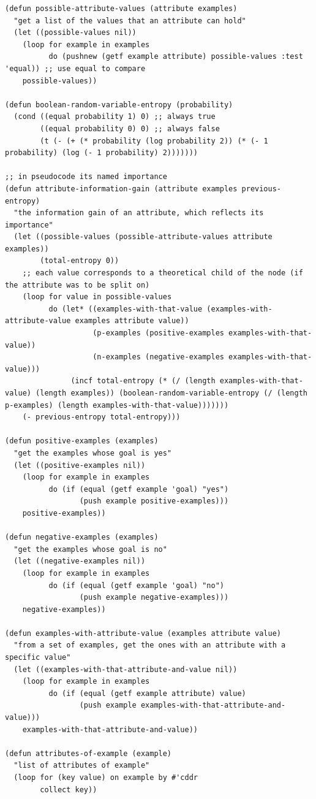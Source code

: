\documentclass[a4paper,12pt]{article}
\begin{document}
\begin{lstlisting}
(defun possible-attribute-values (attribute examples)
  "get a list of the values that an attribute can hold"
  (let ((possible-values nil))
    (loop for example in examples
          do (pushnew (getf example attribute) possible-values :test 'equal)) ;; use equal to compare
    possible-values))

(defun boolean-random-variable-entropy (probability)
  (cond ((equal probability 1) 0) ;; always true
        ((equal probability 0) 0) ;; always false
        (t (- (+ (* probability (log probability 2)) (* (- 1 probability) (log (- 1 probability) 2)))))))

;; in pseudocode its named importance
(defun attribute-information-gain (attribute examples previous-entropy)
  "the information gain of an attribute, which reflects its importance"
  (let ((possible-values (possible-attribute-values attribute examples))
        (total-entropy 0))
    ;; each value corresponds to a theoretical child of the node (if the attribute was to be split on)
    (loop for value in possible-values
          do (let* ((examples-with-that-value (examples-with-attribute-value examples attribute value))
                    (p-examples (positive-examples examples-with-that-value))
                    (n-examples (negative-examples examples-with-that-value)))
               (incf total-entropy (* (/ (length examples-with-that-value) (length examples)) (boolean-random-variable-entropy (/ (length p-examples) (length examples-with-that-value)))))))
    (- previous-entropy total-entropy)))

(defun positive-examples (examples)
  "get the examples whose goal is yes"
  (let ((positive-examples nil))
    (loop for example in examples
          do (if (equal (getf example 'goal) "yes")
                 (push example positive-examples)))
    positive-examples))

(defun negative-examples (examples)
  "get the examples whose goal is no"
  (let ((negative-examples nil))
    (loop for example in examples
          do (if (equal (getf example 'goal) "no")
                 (push example negative-examples)))
    negative-examples))

(defun examples-with-attribute-value (examples attribute value)
  "from a set of examples, get the ones with an attribute with a specific value"
  (let ((examples-with-that-attribute-and-value nil))
    (loop for example in examples
          do (if (equal (getf example attribute) value)
                 (push example examples-with-that-attribute-and-value)))
    examples-with-that-attribute-and-value))

(defun attributes-of-example (example)
  "list of attributes of example"
  (loop for (key value) on example by #'cddr
        collect key))
\end{lstlisting}
\end{document}

